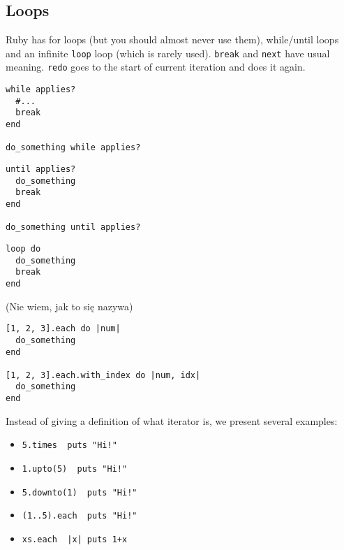
\subsection{Loops}
Ruby has for loops (but you should almost never use them), while/until loops and an infinite \texttt{loop} loop (which is rarely used).
\texttt{break} and \texttt{next} have usual meaning.
\texttt{redo} goes to the start of current iteration and does it again.

\begin{multicols}{3}
\begin{verbatim}
while applies?
  #...
  break
end

do_something while applies?
\end{verbatim}
\columnbreak

\begin{verbatim}
until applies?
  do_something
  break
end

do_something until applies?
\end{verbatim}
\columnbreak

\begin{verbatim}
loop do
  do_something
  break
end
\end{verbatim}
\end{multicols}

(Nie wiem, jak to się nazywa)
\begin{verbatim}
[1, 2, 3].each do |num|
  do_something
end

[1, 2, 3].each.with_index do |num, idx|
  do_something
end
\end{verbatim}
Instead of giving a definition of what iterator is, we present several examples:
\begin{itemize}
  \item \texttt{5.times { puts "Hi!" }}
  \item \texttt{1.upto(5) { puts "Hi!" }}
  \item \texttt{5.down­to(1) { puts "Hi!" }}
  \item \texttt{(1..5).each { puts "Hi!" }}
  \item \texttt{xs.each { |x| puts 1+x }}
\end{itemize}  